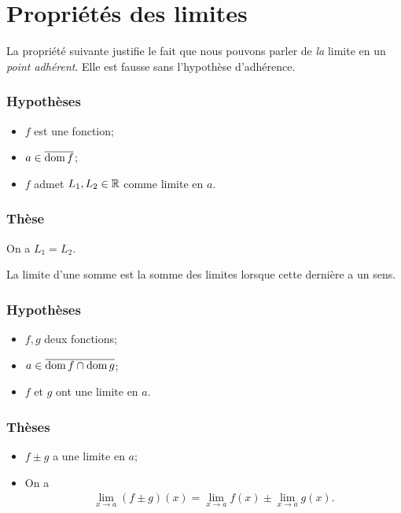 \documentclass[main.tex]{subfiles}
\begin{document}
\section{Propriétés des limites}

La propriété suivante justifie le fait que nous pouvons parler de \emph{la} limite en un \emph{point adhérent}.
Elle est fausse sans l'hypothèse d'adhérence.

\begin{proposition}

    \subsubsection{Hypothèses}
    \begin{itemize}
        \item $f$ est une fonction;
        \item $a \in \overline{\operatorname{dom} f}$;
        \item $f$ admet $L_1, L_2 \in \mathbb{R}$ comme limite en $a$.
    \end{itemize}

    \subsubsection{Thèse}
    On a $L_1 = L_2$.
\end{proposition}

La limite d'une somme est la somme des limites
lorsque cette dernière a un sens.

\begin{proposition}

    \subsubsection{Hypothèses}
    \begin{itemize}
        \item $f, g$ deux fonctions;
        \item $a \in \overline{\operatorname{dom} f \cap \operatorname{dom} g}$;
        \item $f$ et $g$ ont une limite en $a$.
    \end{itemize}

    \subsubsection{Thèses}
    \begin{itemize}
        \item $f \pm g$ a une limite en $a$;
        \item On a
            \begin{align}
                \lim_{x \to a} (f \pm g)(x) = \lim_{x \to a} f(x) \pm \lim_{x \to a} g(x).
            \end{align}
    \end{itemize}
\end{proposition}
\end{document}

